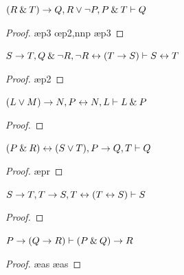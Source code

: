 \begin{small}
\begin{earg}
\item $(R \mathbin{\&} T) \rightarrow Q, R \vee {\neg} P, P \mathbin{\&} T \vdash Q$\smallskip
\begin{proof}
 \pr{}
 \pr{}
 \pr{}
 \ae{p3}
 
 \oe{p2,nnp}
 \ae{p3}
 
 
\end{proof}
\medskip


\item $S \rightarrow T, Q \mathbin{\&} {\neg} R, {\neg} R \leftrightarrow (T \rightarrow S) \vdash S \leftrightarrow T $\smallskip
\begin{proof}
 \pr{}
 \pr{}
 \pr{}
 \ae{p2}
 
 
\end{proof}
\medskip


\item $(L \vee M) \rightarrow N, P \leftrightarrow N, L \vdash L \mathbin{\&} P$\smallskip
\begin{proof}
 \pr{}
 \pr{}
 \pr{}
 
 
 
 
\end{proof}
\medskip

\item $(P \mathbin{\&} R) \leftrightarrow (S \vee T), P \rightarrow Q, T \vdash Q$
\begin{proof}
 \pr{}
 \pr{}
 \pr{}
 
 
 \ae{pr}
 
\end{proof}
\medskip


\item $S \rightarrow T, T \rightarrow S, T \leftrightarrow (T \leftrightarrow S) \vdash S$
\begin{proof}
 \pr{}
 \pr{}
 \pr{}
 
 
 
\end{proof}

\medskip

\end{earg}



\filbreak

\problempart
\begin{earg}
\item $P \rightarrow (Q \rightarrow R) \vdash (P \mathbin{\&} Q) \rightarrow R$
\begin{proof}
	 \pr{}
	\open
	 \as{}
	 \ae{as}
	 
	 \ae{as}
	 
	\close
	 
\end{proof}
\medskip



\end{earg}
\end{small}
